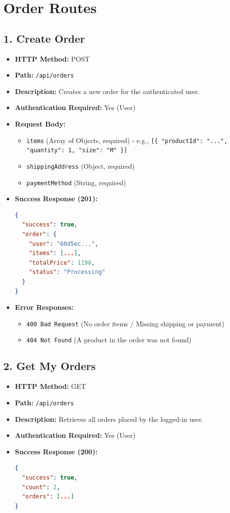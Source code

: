 \documentclass[12pt,a4paper]{article}
\begin{document}
\section{Order Routes}

\subsection{1. Create Order}
\begin{itemize}
    \item \textbf{HTTP Method:} POST
    \item \textbf{Path:} \texttt{/api/orders}
    \item \textbf{Description:} Creates a new order for the authenticated user.
    \item \textbf{Authentication Required:} Yes (User)
    \item \textbf{Request Body:}
    \begin{itemize}
        \item \texttt{items} (Array of Objects, required) - e.g., \texttt{[\{ "productId": "...", "quantity": 1, "size": "M" \}]}
        \item \texttt{shippingAddress} (Object, required)
        \item \texttt{paymentMethod} (String, required)
    \end{itemize}
    \item \textbf{Success Response (201):}
\begin{lstlisting}[language=json]
{
  "success": true,
  "order": {
    "user": "60d5ec...",
    "items": [...],
    "totalPrice": 1198,
    "status": "Processing"
  }
}
\end{lstlisting}
    \item \textbf{Error Responses:}
    \begin{itemize}
        \item \texttt{400 Bad Request} (No order items / Missing shipping or payment)
        \item \texttt{404 Not Found} (A product in the order was not found)
    \end{itemize}
\end{itemize}

\subsection{2. Get My Orders}
\begin{itemize}
    \item \textbf{HTTP Method:} GET
    \item \textbf{Path:} \texttt{/api/orders}
    \item \textbf{Description:} Retrieves all orders placed by the logged-in user.
    \item \textbf{Authentication Required:} Yes (User)
    \item \textbf{Success Response (200):}
\begin{lstlisting}[language=json]
{
  "success": true,
  "count": 2,
  "orders": [...]
}
\end{lstlisting}
\end{itemize}
\end{document}
